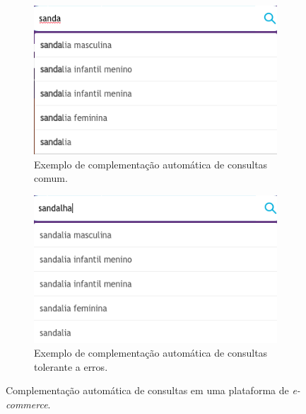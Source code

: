 \begin{figure}[htbp]
    \centering
    \begin{subfigure}[b]{0.49\textwidth}
        \includegraphics[width=\textwidth]{figures/autocomplete_example1.png}
        \caption{Exemplo de complementação automática de consultas comum.}
        \label{fig:common_autocomplete}
    \end{subfigure}
    \begin{subfigure}[b]{0.49\textwidth}
        \includegraphics[width=\textwidth]{figures/autocomplete_example2.png}
        \caption{Exemplo de complementação automática de consultas tolerante a erros.}
        \label{fig:error_tolerant_autocomplete}
    \end{subfigure}
    \caption{Complementação automática de consultas em uma plataforma de \textit{e-commerce}. }
    \label{fig:query_autocompletion_example}
\end{figure}


